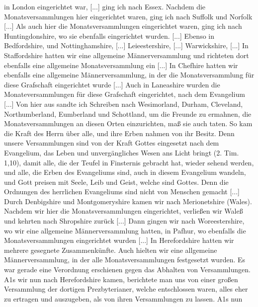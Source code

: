 in London eingerichtet war, [...] ging ich nach Essex. Nachdem
die Monatsversammlungen hier eingerichtet waren, ging ich nach
Suffolk und Norfolk [...] Als 
auch hier die Monatsversammlungen eingerichtet waren, ging ich 
nach Huntingdonshire, wo sie
ebenfalls eingerichtet wurden. [...] Ebenso in Bedfordshire,
und Nottinghamshire, [...] 
Leieestershire, [...] Warwickshire,
[...] In Staffordshire hatten wir eine allgemeine 
Männerversammlung und richteten dort ebenfalls eine allgemeine 
Monatsversammlung ein [...] In Chefhire hatten wir ebenfalls eine
allgemeine Männerversammlung, in der die Monatsversammlung
für diese Grafschaft eingerichtet wurde [...] Auch in Laneashire
wurden die Monateversammlungen für diese Grafschaft eingerichtet, 
nach dem Evangelium [...] Von hier aus sandte ich
Schreiben nach Wesimorland, Durham, Cleveland, Northumberland, 
Eumberland und Schottland, um die Freunde zu ermahnen,
die Monatsversammlungen an diesen Orten einzurichten, maß sie
auch taten. So kam die Kraft des Herrn über alle, und ihre
Erben nahmen von ihr Besitz. Denn unsere Versammlungen
sind von der Kraft Gottes eingesetzt nach dem Evangelium, das
Leben und unvergängliches Wesen ans Licht bringt (2. Tim. 1,10),
damit alle, die der Teufel in Finsternis gebracht hat, wieder
sehend werden, und alle, die Erben des Evangeliums sind, auch in
diesem Evangelium wandeln, und Gott preisen mit Seele, Leib und
Geist, welche sind Gottes. Denn die Ordnungen des herrlichen
Evangeliums sind nicht von Menschen gemacht [...]
Durch Denbigshire und Montgomeryshire kamen wir nach
Merionetshire (Wales). Nachdem wir hier die Monatsversammlungen
eingerichtet, verließen wir Waleß und kehrten nach Shropshire
zurück [...] Dann gingen wir nach Woreestershire, wo wir
eine allgemeine Männerversammlung hatten, in Pafhur, wo ebenfalls
die Monatsversammlungen eingerichtet wurden [...]
In Herefordshire hatten wir mehrere gesegnete Zusammenkünfte. 
Auch hielten wir eine allgemeine Männerversammlung,
in der alle Monatsversammlungen festgesetzt wurden. Es war
gerade eine Verordnung erschienen gegen das Abhalten von Versammlungen. 
A1s wir nun nach Herefordshire kamen, berichtete
man uns von einer großen Versammlung der dortigen Prezbyterianer, 
welche entschlossen waren, alles eher zu ertragen und
auszugeben, als von ihren Versammlungen zu lassen. A1s nun
